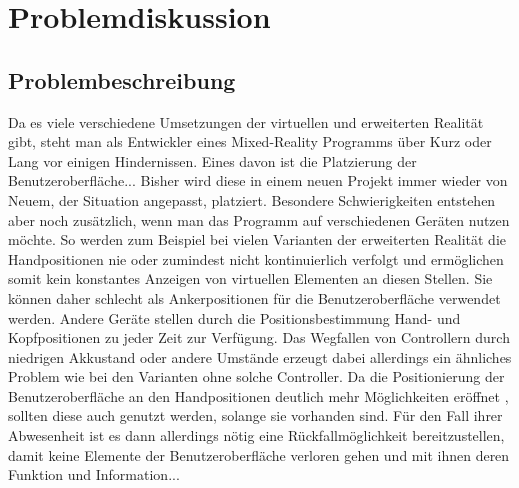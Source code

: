 
\chapter{Problemdiskussion}\label{chapter:dimensionwise_refinement}

			
	
		
		
	\section{Problembeschreibung}
		Da es viele verschiedene Umsetzungen der virtuellen und erweiterten Realität gibt, steht man als Entwickler eines Mixed-Reality Programms über Kurz oder Lang vor einigen Hindernissen. Eines davon ist die Platzierung der Benutzeroberfläche...
		Bisher wird diese in einem neuen Projekt immer wieder von Neuem, der Situation angepasst, platziert.
		Besondere Schwierigkeiten entstehen aber noch zusätzlich, wenn man das Programm auf verschiedenen Geräten nutzen möchte. So werden zum Beispiel bei vielen Varianten der erweiterten Realität die Handpositionen nie oder zumindest nicht kontinuierlich verfolgt und ermöglichen somit kein konstantes Anzeigen von virtuellen Elementen an diesen Stellen. Sie können daher schlecht als Ankerpositionen für die Benutzeroberfläche verwendet werden.
		Andere Geräte stellen durch die Positionsbestimmung  Hand- und Kopfpositionen zu jeder Zeit zur Verfügung. Das Wegfallen von Controllern durch niedrigen Akkustand oder andere Umstände erzeugt dabei allerdings ein ähnliches Problem wie bei den Varianten ohne solche Controller.
		Da die Positionierung der Benutzeroberfläche an den Handpositionen deutlich mehr Möglichkeiten eröffnet , sollten diese auch genutzt werden, solange sie vorhanden sind. Für den Fall ihrer Abwesenheit ist es dann allerdings nötig eine Rückfallmöglichkeit bereitzustellen, damit keine Elemente der Benutzeroberfläche verloren gehen und mit ihnen deren Funktion und Information...
		
